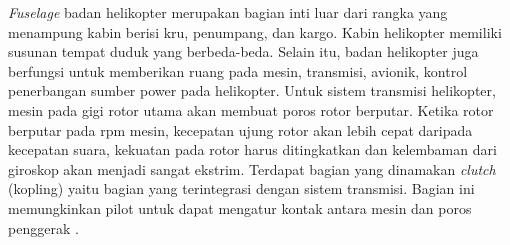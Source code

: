 \textit{Fuselage} badan helikopter merupakan bagian inti luar dari rangka yang menampung kabin berisi kru, penumpang, dan kargo. Kabin helikopter memiliki susunan tempat duduk yang berbeda-beda. Selain itu, badan helikopter juga berfungsi untuk memberikan ruang pada mesin, transmisi, avionik, kontrol penerbangan sumber power pada helikopter. Untuk sistem transmisi helikopter, mesin pada gigi rotor utama akan membuat poros rotor berputar. Ketika rotor berputar pada rpm mesin, kecepatan ujung rotor akan lebih cepat daripada kecepatan suara, kekuatan pada rotor harus ditingkatkan dan kelembaman dari giroskop akan menjadi sangat ekstrim. Terdapat bagian yang dinamakan \textit{clutch} (kopling) yaitu bagian yang terintegrasi dengan sistem transmisi. Bagian ini memungkinkan pilot untuk dapat mengatur kontak antara mesin dan poros penggerak \cite{wagtendonk2006principles}.

